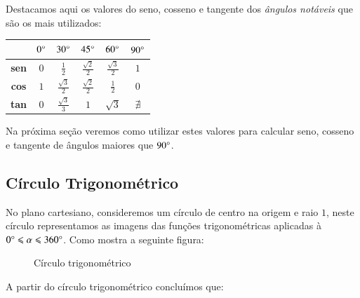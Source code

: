  Destacamos aqui os valores do seno, cosseno e tangente dos \emph{ângulos notáveis} que são os mais utilizados:

 \begin{table}[H]
 \centering
 \begin{tabular}{|c|c|c|c|c|c|} \hline
 \rowcolor{cinza}
               & $0 \degree$  & $30 \degree$  & $45 \degree$  & $60 \degree$ & $90 \degree$  \\\hline
  \textbf{sen} & $0$ &$\frac{1}{2}$ & $\frac{\sqrt{2}}{2}$ & $\frac{\sqrt{3}}{2}$ & $1$ \\\hline
  \textbf{cos} & $1$ & $\frac{\sqrt{3}}{2}$ & $\frac{\sqrt{2}}{2}$ & $\frac{1}{2}$ & $0$ \\\hline
  \textbf{tan} & $0$ & $\frac{\sqrt{3}}{3}$ & $1$ & $\sqrt{3}$ & $\nexists$ \\\hline
 \end{tabular}
\end{table}
 Na próxima seção veremos como utilizar estes valores para calcular seno, cosseno e tangente de ângulos maiores que $90 \degree$.

\subsection{Círculo Trigonométrico}

 No plano cartesiano, consideremos um círculo de centro na origem e raio $1$, neste círculo representamos as imagens das funções trigonométricas aplicadas à  $0 \degree \leqslant \alpha \leqslant 360 \degree$. Como mostra a seguinte figura:
 \begin{figure}[H]
   \centering
   \caption{Círculo trigonométrico}
  \end{figure}

  A partir do círculo trigonométrico concluímos que:

